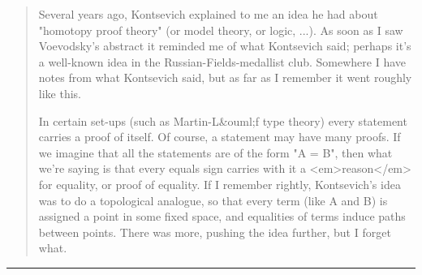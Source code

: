 \begin{quote}
 Several years ago, Kontsevich explained
 to me an idea he had about "homotopy proof theory" (or model theory, or
 logic, ...).  As soon as I saw Voevodsky's abstract it reminded me of
 what Kontsevich said; perhaps it's a well-known idea in the
 Russian-Fields-medallist club.  Somewhere I have notes from what
 Kontsevich said, but as far as I remember it went roughly like this.  
 
 In certain set-ups (such as Martin-L&ouml;f type theory) every statement
 carries a proof of itself.  Of course, a statement may have many proofs.
 If we imagine that all the statements are of the form "A = B", then what
 we're saying is that every equals sign carries with it a <em>reason</em> for
 equality, or proof of equality.  If I remember rightly, Kontsevich's
 idea was to do a topological analogue, so that every term (like A and B)
 is assigned a point in some fixed space, and equalities of terms induce
 paths between points.  There was more, pushing the idea further, but I
 forget what.  
\end{quote}
    


\par\noindent\rule{\textwidth}{0.4pt}


